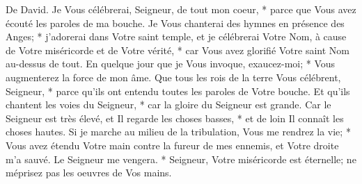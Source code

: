 De David. Je Vous célébrerai, Seigneur, de tout mon coeur, * parce que Vous avez écouté les paroles de ma bouche. Je Vous chanterai des hymnes en présence des Anges; *
j'adorerai dans Votre saint temple, et je célébrerai Votre Nom, à cause de Votre miséricorde et de Votre vérité, * car Vous avez glorifié Votre saint Nom au-dessus de tout.
En quelque jour que je Vous invoque, exaucez-moi; * Vous augmenterez la force de mon âme.
Que tous les rois de la terre Vous célébrent, Seigneur, * parce qu'ils ont entendu toutes les paroles de Votre bouche.
Et qu'ils chantent les voies du Seigneur, * car la gloire du Seigneur est grande.
Car le Seigneur est très élevé, et Il regarde les choses basses, * et de loin Il connaît les choses hautes.
Si je marche au milieu de la tribulation, Vous me rendrez la vie; * Vous avez étendu Votre main contre la fureur de mes ennemis, et Votre droite m'a sauvé.
Le Seigneur me vengera. * Seigneur, Votre miséricorde est éternelle; ne méprisez pas les oeuvres de Vos mains.

